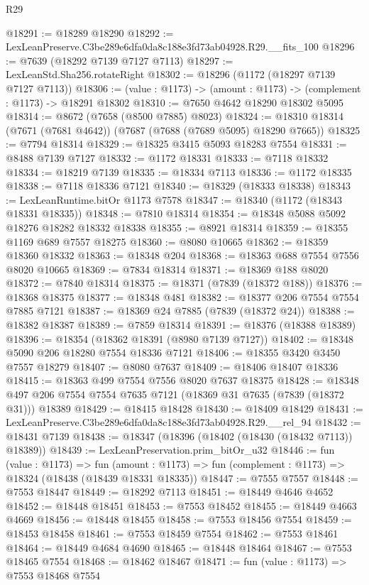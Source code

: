\begin{lexlean}{R29}
\begin{coremodule}
@18291 := @18289 @18290
@18292 := LexLeanPreserve.C3be289e6dfa0da8c188e3fd73ab04928.R29.__fits_100
@18296 := @7639 (@18292 @7139 @7127 @7113)
@18297 := LexLeanStd.Sha256.rotateRight
@18302 := @18296 (@1172 (@18297 @7139 @7127 @7113))
@18306 := (value : @1173) -> (amount : @1173) -> (complement : @1173) -> @18291 @18302
@18310 := @7650 @4642 @18290 @18302 @5095
@18314 := @8672 (@7658 (@8500 @7885) @8023)
@18324 := @18310 @18314 (@7671 (@7681 @4642)) (@7687 (@7688 (@7689 @5095) @18290 @7665))
@18325 := @7794 @18314
@18329 := @18325 @3415 @5093 @18283 @7554
@18331 := @8488 @7139 @7127
@18332 := @1172 @18331
@18333 := @7118 @18332
@18334 := @18219 @7139
@18335 := @18334 @7113
@18336 := @1172 @18335
@18338 := @7118 @18336 @7121
@18340 := @18329 (@18333 @18338)
@18343 := LexLeanRuntime.bitOr @1173 @7578
@18347 := @18340 (@1172 (@18343 @18331 @18335))
@18348 := @7810 @18314
@18354 := @18348 @5088 @5092 @18276 @18282 @18332 @18338
@18355 := @8921 @18314
@18359 := @18355 @1169 @689 @7557 @18275
@18360 := @8080 @10665
@18362 := @18359 @18360 @18332
@18363 := @18348 @204
@18368 := @18363 @688 @7554 @7556 @8020 @10665
@18369 := @7834 @18314
@18371 := @18369 @188 @8020
@18372 := @7840 @18314
@18375 := @18371 (@7839 (@18372 @188))
@18376 := @18368 @18375
@18377 := @18348 @481
@18382 := @18377 @206 @7554 @7554 @7885 @7121
@18387 := @18369 @24 @7885 (@7839 (@18372 @24))
@18388 := @18382 @18387
@18389 := @7859 @18314
@18391 := @18376 (@18388 @18389)
@18396 := @18354 (@18362 @18391 (@8980 @7139 @7127))
@18402 := @18348 @5090 @206 @18280 @7554 @18336 @7121
@18406 := @18355 @3420 @3450 @7557 @18279
@18407 := @8080 @7637
@18409 := @18406 @18407 @18336
@18415 := @18363 @499 @7554 @7556 @8020 @7637 @18375
@18428 := @18348 @497 @206 @7554 @7554 @7635 @7121 (@18369 @31 @7635 (@7839 (@18372 @31))) @18389
@18429 := @18415 @18428
@18430 := @18409 @18429
@18431 := LexLeanPreserve.C3be289e6dfa0da8c188e3fd73ab04928.R29.__rel_94
@18432 := @18431 @7139
@18438 := @18347 (@18396 (@18402 (@18430 (@18432 @7113)) @18389))
@18439 := LexLeanPreservation.prim_bitOr_u32
@18446 := fun (value : @1173) =>
  fun (amount : @1173) => fun (complement : @1173) => @18324 (@18438 (@18439 @18331 @18335))
@18447 := @7555 @7557
@18448 := @7553 @18447
@18449 := @18292 @7113
@18451 := @18449 @4646 @4652
@18452 := @18448 @18451
@18453 := @7553 @18452
@18455 := @18449 @4663 @4669
@18456 := @18448 @18455
@18458 := @7553 @18456 @7554
@18459 := @18453 @18458
@18461 := @7553 @18459 @7554
@18462 := @7553 @18461
@18464 := @18449 @4684 @4690
@18465 := @18448 @18464
@18467 := @7553 @18465 @7554
@18468 := @18462 @18467
@18471 := fun (value : @1173) => @7553 @18468 @7554

\end{coremodule}
\end{lexlean}
